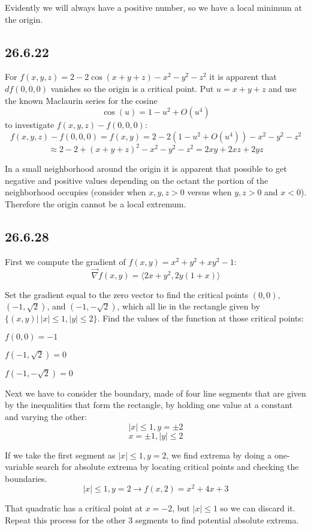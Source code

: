 \documentclass{article}
\begin{document}
Evidently we will always have a positive number, so we have a local minimum at the origin.

\subsection{26.6.22}

For $f(x,y,z) = 2 - 2 \cos(x + y + z) - x^2 - y^2 - z^2$ it is apparent that $df(0,0,0)$ vanishes so the origin is a critical point. Put $u=x+y+z$ and use the known Maclaurin series for the cosine $$\cos(u) = 1-u^2+O(u^4)$$ to investigate $f(x,y,z) - f(0,0,0)$:
$$f(x,y,z) - f(0,0,0) = f(x,y) = 2-2(1-u^2+O(u^4))-x^2-y^2-z^2$$
$$\approx 2-2+(x+y+z)^2-x^2-y^2-z^2 = 2 x y + 2 x z + 2 y z $$

In a small neighborhood around the origin it is apparent that possible to get negative and positive values depending on the octant the portion of the neighborhood occupies (consider when $x,y,z > 0$ versus when $y,z>0$ and $x < 0$). Therefore the origin cannot be a local extremum.

\subsection{26.6.28}

First we compute the gradient of $f(x,y) = x^2+y^2+xy^2-1$:
$$\vec{\nabla}f(x,y) = \langle 2x +y^2,2y(1+x) \rangle$$

Set the gradient equal to the zero vector to find the critical points $(0,0)$, $(-1,\sqrt{2})$, and $(-1,-\sqrt{2})$, which all lie in the rectangle given by $\{(x, y)|~|x| \leq 1, |y| \leq 2\}$. Find the values of the function at those critical points:

$f(0,0) = -1$

$f(-1,\sqrt{2}) = 0$

$f(-1,-\sqrt{2}) = 0$

Next we have to consider the boundary, made of four line segments that are given by the inequalities that form the rectangle, by holding one value at a constant and varying the other:
$$|x| \leq 1, y = \pm 2$$
$$x = \pm 1, |y| \leq 2$$

If we take the first segment as $|x| \leq 1, y = 2$, we find extrema by doing a one-variable search for absolute extrema by locating critical points and checking the boundaries.
$$|x| \leq 1, y = 2 \to f(x,2) = x^2+4x+3 $$

That quadratic has a critical point at $x=-2$, but $|x| \leq 1$ so we can discard it. Repeat this process for the other 3 segments to find potential absolute extrema.
\end{document}
